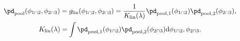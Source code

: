 \begin{equation}
\begin{gathered}
  \pd_{\text{pool}} (\phi_{1 \cap 2}, \phi_{2 \cap 3}) = 
  g_{\text{lin}}(\phi_{1 \cap 2}, \phi_{2 \cap 3}) =
  \frac{1}{K_{\text{lin}}(\lambda)}
  \pd_{\text{pool}, 1}(\phi_{1 \cap 2}) 
  \pd_{\text{pool}, 2}(\phi_{2 \cap 3}), \\
  K_{\text{lin}}(\lambda) = 
    \int 
      \pd_{\text{pool}, 1}(\phi_{1 \cap 2}) 
      \pd_{\text{pool}, 2}(\phi_{2 \cap 3})
    \text{d}\phi_{1 \cap 2}, \phi_{2 \cap 3}.
  \label{eqn:silly-linear-overall}
\end{gathered}
\end{equation}